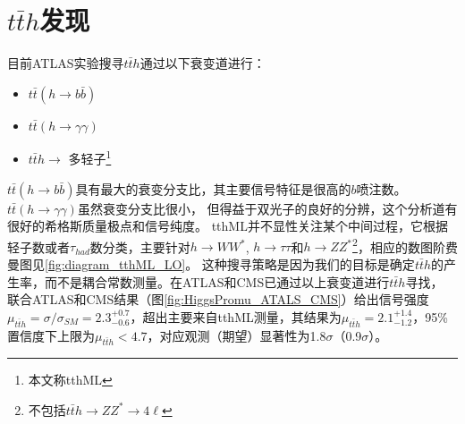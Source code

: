 \section{$t\bar{t}h$发现}
目前ATLAS实验搜寻$t\bar{t}h$通过以下衰变道进行：
\begin{itemize}
 \item $t\bar{t}(h\rightarrow b\bar{b})$
 \item $t\bar{t}(h\rightarrow \gamma\gamma)$
 \item $t\bar{t}h\rightarrow$ 多轻子\footnote{本文称tthML}
\end{itemize}
$t\bar{t}(h\rightarrow b\bar{b})$具有最大的衰变分支比，其主要信号特征是很高的$b$喷注数。$t\bar{t}(h\rightarrow \gamma\gamma)$虽然衰变分支比很小，
但得益于双光子的良好的分辨，这个分析道有很好的希格斯质量极点和信号纯度。
tthML并不显性关注某个中间过程，它根据轻子数或者$\tau_{had}$数分类，主要针对$h\rightarrow WW^*$, $h\rightarrow \tau\tau$和$h\rightarrow ZZ^*$\footnote{不包括$t\bar{t}h\rightarrow ZZ^*\rightarrow 4\ell$}，相应的数图阶费曼图见\ref{fig:diagram_tthML_LO}。
这种搜寻策略是因为我们的目标是确定$t\bar{t}h$的产生率，而不是耦合常数测量。在\RunOne ATLAS和CMS已通过以上衰变道进行$t\bar{t}h$寻找\cite{Aad:2015iha,Aad:2015gra,Aad:2014lma,Khachatryan:2014qaa,Khachatryan:2015ila,Khachatryan:2016vau}，
联合ATLAS和CMS结果（图\ref{fig:HiggsPromu_ATALS_CMS}）给出信号强度$\mu_{t\bar{t}h}=\sigma/\sigma_{SM}=2.3^{+0.7}_{-0.6}$，超出主要来自tthML测量，其结果为$\mu_{t\bar{t}h}=2.1^{+1.4}_{-1.2}$，95\%置信度下上限为$\mu_{t\bar{t}h}<4.7$，对应观测（期望）显著性为1.8$\sigma$（0.9$\sigma$）。

